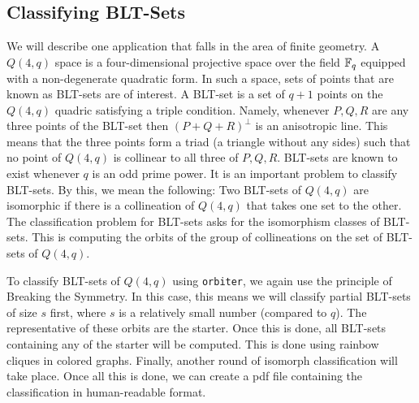 
\subsection{Classifying BLT-Sets}


We will describe one application that falls in the area of finite geometry. 
A $Q(4,q)$ space is a four-dimensional projective space over the field ${\mathbb F}_q$ equipped with a non-degenerate quadratic form. 
In such a space, sets of points that are known as BLT-sets are of interest.
A BLT-set is a set of $q+1$ points on the $Q(4,q)$ quadric 
satisfying a triple condition. 
Namely, whenever $P,Q,R$ are any three points of the BLT-set then $(P+Q+R)^\perp$ 
is an anisotropic line. This means that the three points form a triad 
(a triangle without any sides) such that no point of $Q(4,q)$ 
is  collinear to all three of $P,Q,R$.
BLT-sets are known to exist whenever $q$ is an odd prime power. 
It is an important problem to classify BLT-sets. 
By this, we mean the following: Two BLT-sets of $Q(4,q)$ are isomorphic 
if there is a collineation of $Q(4,q)$ that takes one set to the other. 
The classification problem for BLT-sets asks for the isomorphism classes of BLT-sets. 
This is computing the orbits of the group of collineations on 
the set of BLT-sets of $Q(4,q).$



\bigskip

To classify BLT-sets of $Q(4,q)$ using \verb'orbiter', 
we again use the principle of 
Breaking the Symmetry. In this case, this means 
we will classify partial BLT-sets of size $s$ first, where $s$ is a relatively small number (compared to $q$). 
The representative of these orbits are the starter. 
Once this is done, 
all BLT-sets containing any of the starter will be computed. 
This is done using rainbow cliques in colored graphs. 
Finally, another round 
of isomorph classification will take place. 
Once all this is done, we can create a pdf file containing the classification
in human-readable format.


\bigskip


